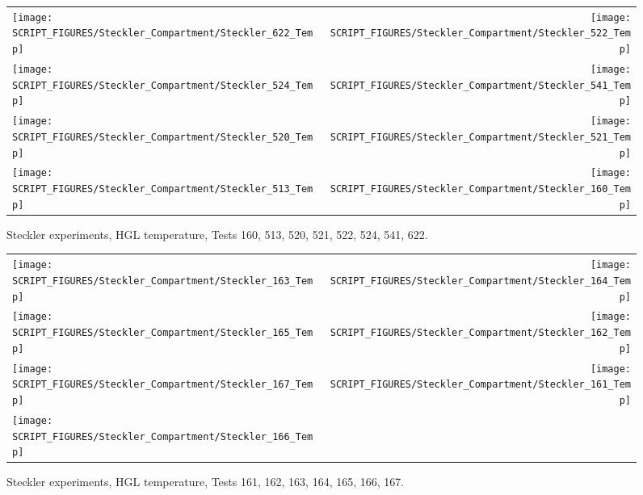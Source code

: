 \begin{figure}[p]
\begin{tabular*}{\textwidth}{l@{\extracolsep{\fill}}r}
\texttt{[image: SCRIPT\_FIGURES/Steckler\_Compartment/Steckler\_622\_Temp]} &
\texttt{[image: SCRIPT\_FIGURES/Steckler\_Compartment/Steckler\_522\_Temp]} \\
\texttt{[image: SCRIPT\_FIGURES/Steckler\_Compartment/Steckler\_524\_Temp]} &
\texttt{[image: SCRIPT\_FIGURES/Steckler\_Compartment/Steckler\_541\_Temp]} \\
\texttt{[image: SCRIPT\_FIGURES/Steckler\_Compartment/Steckler\_520\_Temp]} &
\texttt{[image: SCRIPT\_FIGURES/Steckler\_Compartment/Steckler\_521\_Temp]} \\
\texttt{[image: SCRIPT\_FIGURES/Steckler\_Compartment/Steckler\_513\_Temp]} &
\texttt{[image: SCRIPT\_FIGURES/Steckler\_Compartment/Steckler\_160\_Temp]}
\end{tabular*}
\caption[Steckler experiments, HGL temperature, Tests 160, 513, 520, 521, 522, 524, 541, 622]
{Steckler experiments, HGL temperature, Tests 160, 513, 520, 521, 522, 524, 541, 622.}
\label{Steckler_Temp_6}
\end{figure}

\begin{figure}[p]
\begin{tabular*}{\textwidth}{l@{\extracolsep{\fill}}r}
\texttt{[image: SCRIPT\_FIGURES/Steckler\_Compartment/Steckler\_163\_Temp]} &
\texttt{[image: SCRIPT\_FIGURES/Steckler\_Compartment/Steckler\_164\_Temp]} \\
\texttt{[image: SCRIPT\_FIGURES/Steckler\_Compartment/Steckler\_165\_Temp]} &
\texttt{[image: SCRIPT\_FIGURES/Steckler\_Compartment/Steckler\_162\_Temp]} \\
\texttt{[image: SCRIPT\_FIGURES/Steckler\_Compartment/Steckler\_167\_Temp]} &
\texttt{[image: SCRIPT\_FIGURES/Steckler\_Compartment/Steckler\_161\_Temp]} \\
\texttt{[image: SCRIPT\_FIGURES/Steckler\_Compartment/Steckler\_166\_Temp]} &
\end{tabular*}
\caption[Steckler experiments, HGL temperature, Tests 161, 162, 163, 164, 165, 166, 167]
{Steckler experiments, HGL temperature, Tests 161, 162, 163, 164, 165, 166, 167.}
\label{Steckler_Temp_7}
\end{figure}


\clearpage

